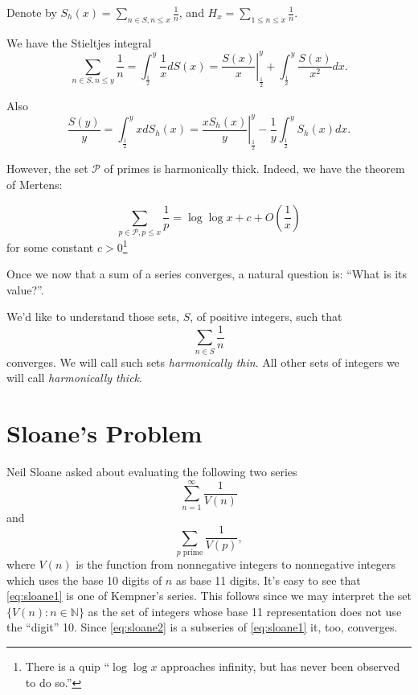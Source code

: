 \documentclass{article}
\newcommand{\NN}{\mathbb{N}}
\begin{document}
Denote by $S_h(x) = \sum_{n \in S, n \le x}\frac{1}{n}$, and $H_x =
\sum_{1 \le n \le x} \frac{1}{n}$.

We have the Stieltjes integral
\begin{displaymath}
  \sum_{n \in S, n \le y} \frac{1}{n} = \int_{\frac{1}{2}}^y \frac{1}{x} d S(x) =
\left.\frac{S(x)}{x} \right|_{\frac{1}{2}}^y + \int_{\frac{1}{2}}^y \frac{S(x)}{x^2} dx.
\end{displaymath}

Also
\begin{displaymath}
  \frac{S(y)}{y} = \int_{\frac{1}{2}}^y x d S_h(x) = \left. \frac{x S_h(x)}{y}
  \right|_{\frac{1}{2}}^y - \frac{1}{y} \int_{\frac{1}{2}}^y S_h(x) dx.
\end{displaymath}

However, the set $\mathcal{P}$ of primes is harmonically
thick. Indeed, we have the theorem of Mertens:

\begin{equation}
\label{eq:mertens}
\sum_{p \in \mathcal{P}, p \le x} \frac{1}{p} = \log \log x + c +
O\left(\frac{1}{x}\right)
\end{equation}
for some constant $c > 0$\footnote{There is a quip ``$\log \log x$
  approaches infinity, but has never been observed to do so.''}

Once we now that a sum of a series converges, a natural question is:
``What is its value?''.

We'd like to understand those sets, $S$, of positive integers, such
that
\begin{equation}
  \label{eq:thin}
  \sum_{n \in S} \frac{1}{n}
\end{equation}
converges. We will call such sets \emph{harmonically thin}. All other
sets of integers we will call \emph{harmonically thick}. 

\section{Sloane's Problem}
\label{sec:sloane}

Neil Sloane asked about evaluating the following two series
\begin{equation}
  \label{eq:sloane1}
  \sum_{n=1}^\infty \frac{1}{V(n)}
\end{equation}
and
\begin{equation}
  \label{eq:sloane2}
  \sum_{p \text{ prime}} \frac{1}{V(p)},
\end{equation}
where $V(n)$ is the function from nonnegative integers to
nonnegative integers which uses the base 10 digits of $n$ as base 11
digits. It's easy to see that \eqref{eq:sloane1} is one of Kempner's
series.  This follows since we may interpret the set
$\{V(n) : n \in \NN\}$ as the set of integers whose base 11
representation does not use the ``digit'' 10.  Since
\eqref{eq:sloane2} is a subseries of \eqref{eq:sloane1} it, too,
converges.
\end{document}
